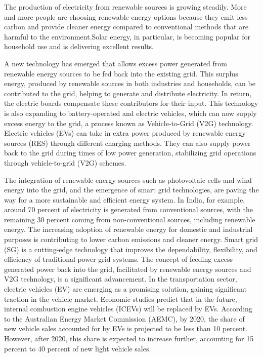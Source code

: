 \documentclass[3p,times,onecolumn]{elsarticle}
\begin{document}
The production of electricity from renewable sources is growing steadily. More and more people are choosing renewable energy options because they emit less carbon and provide cleaner energy compared to conventional methods that are harmful to the environment.Solar energy, in particular, is becoming popular for household use and is delivering excellent results.


A new technology has emerged that allows excess power generated from renewable energy sources to be fed back into the existing grid. This surplus energy, produced by renewable sources in both industries and households, can be contributed to the grid, helping to generate and distribute electricity. In return, the electric boards compensate these contributors for their input. This technology is also expanding to battery-operated and electric vehicles, which can now supply excess energy to the grid, a process known as Vehicle-to-Grid (V2G) technology.\cite{GT3}
Electric vehicles (EVs) can take in extra power produced by renewable energy sources (RES) through different charging methods. They can also supply power back to the grid during times of low power generation, stabilizing grid operations through vehicle-to-grid (V2G) schemes.\cite{GT2}


 
The integration of renewable energy sources such as photovoltaic cells and wind energy into the grid, and the emergence of smart grid technologies, are paving the way for a more sustainable and efficient energy system. In India, for example, around 70 percent of electricity is generated from conventional sources, with the remaining 30 percent coming from non-conventional sources, including renewable energy. The increasing adoption of renewable energy for domestic and industrial purposes is contributing to lower carbon emissions and cleaner energy. Smart grid (SG) is a cutting-edge technology that improves the dependability, flexibility, and efficiency of traditional power grid systems.  The concept of feeding excess generated power back into the grid, facilitated by renewable energy sources and V2G technology, is a significant advancement. In the transportation sector, electric vehicles (EV) are emerging as a promising solution, gaining significant traction in the vehicle market. Economic studies predict that in the future, internal combustion engine vehicles (ICEVs) will be replaced by EVs. According to the Australian Energy Market Commission (AEMC), by 2020, the share of new vehicle sales accounted for by EVs is projected to be less than 10 percent. However, after 2020, this share is expected to increase further, accounting for 15 percent to 40 percent of new light vehicle sales.\cite{GT4}
\end{document}
